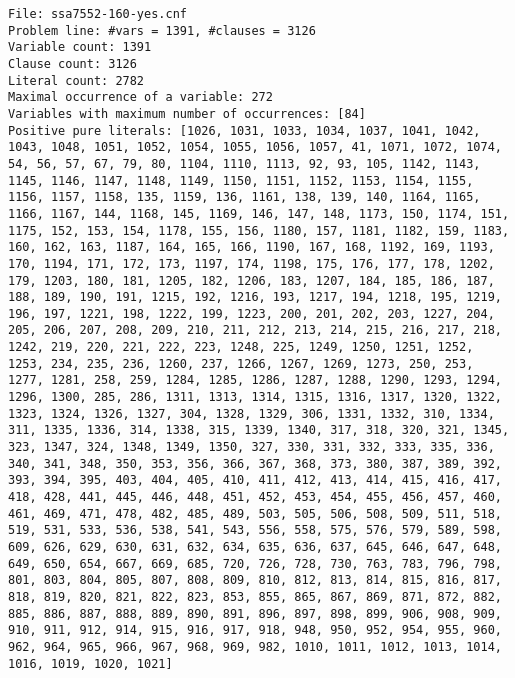 \documentclass[a4paper,10pt]{article}
\begin{document}
\begin{lstlisting}
File: ssa7552-160-yes.cnf
Problem line: #vars = 1391, #clauses = 3126
Variable count: 1391
Clause count: 3126
Literal count: 2782
Maximal occurrence of a variable: 272
Variables with maximum number of occurrences: [84]
Positive pure literals: [1026, 1031, 1033, 1034, 1037, 1041, 1042, 1043, 1048, 1051, 1052, 1054, 1055, 1056, 1057, 41, 1071, 1072, 1074, 54, 56, 57, 67, 79, 80, 1104, 1110, 1113, 92, 93, 105, 1142, 1143, 1145, 1146, 1147, 1148, 1149, 1150, 1151, 1152, 1153, 1154, 1155, 1156, 1157, 1158, 135, 1159, 136, 1161, 138, 139, 140, 1164, 1165, 1166, 1167, 144, 1168, 145, 1169, 146, 147, 148, 1173, 150, 1174, 151, 1175, 152, 153, 154, 1178, 155, 156, 1180, 157, 1181, 1182, 159, 1183, 160, 162, 163, 1187, 164, 165, 166, 1190, 167, 168, 1192, 169, 1193, 170, 1194, 171, 172, 173, 1197, 174, 1198, 175, 176, 177, 178, 1202, 179, 1203, 180, 181, 1205, 182, 1206, 183, 1207, 184, 185, 186, 187, 188, 189, 190, 191, 1215, 192, 1216, 193, 1217, 194, 1218, 195, 1219, 196, 197, 1221, 198, 1222, 199, 1223, 200, 201, 202, 203, 1227, 204, 205, 206, 207, 208, 209, 210, 211, 212, 213, 214, 215, 216, 217, 218, 1242, 219, 220, 221, 222, 223, 1248, 225, 1249, 1250, 1251, 1252, 1253, 234, 235, 236, 1260, 237, 1266, 1267, 1269, 1273, 250, 253, 1277, 1281, 258, 259, 1284, 1285, 1286, 1287, 1288, 1290, 1293, 1294, 1296, 1300, 285, 286, 1311, 1313, 1314, 1315, 1316, 1317, 1320, 1322, 1323, 1324, 1326, 1327, 304, 1328, 1329, 306, 1331, 1332, 310, 1334, 311, 1335, 1336, 314, 1338, 315, 1339, 1340, 317, 318, 320, 321, 1345, 323, 1347, 324, 1348, 1349, 1350, 327, 330, 331, 332, 333, 335, 336, 340, 341, 348, 350, 353, 356, 366, 367, 368, 373, 380, 387, 389, 392, 393, 394, 395, 403, 404, 405, 410, 411, 412, 413, 414, 415, 416, 417, 418, 428, 441, 445, 446, 448, 451, 452, 453, 454, 455, 456, 457, 460, 461, 469, 471, 478, 482, 485, 489, 503, 505, 506, 508, 509, 511, 518, 519, 531, 533, 536, 538, 541, 543, 556, 558, 575, 576, 579, 589, 598, 609, 626, 629, 630, 631, 632, 634, 635, 636, 637, 645, 646, 647, 648, 649, 650, 654, 667, 669, 685, 720, 726, 728, 730, 763, 783, 796, 798, 801, 803, 804, 805, 807, 808, 809, 810, 812, 813, 814, 815, 816, 817, 818, 819, 820, 821, 822, 823, 853, 855, 865, 867, 869, 871, 872, 882, 885, 886, 887, 888, 889, 890, 891, 896, 897, 898, 899, 906, 908, 909, 910, 911, 912, 914, 915, 916, 917, 918, 948, 950, 952, 954, 955, 960, 962, 964, 965, 966, 967, 968, 969, 982, 1010, 1011, 1012, 1013, 1014, 1016, 1019, 1020, 1021]

\end{lstlisting}
\end{document}
